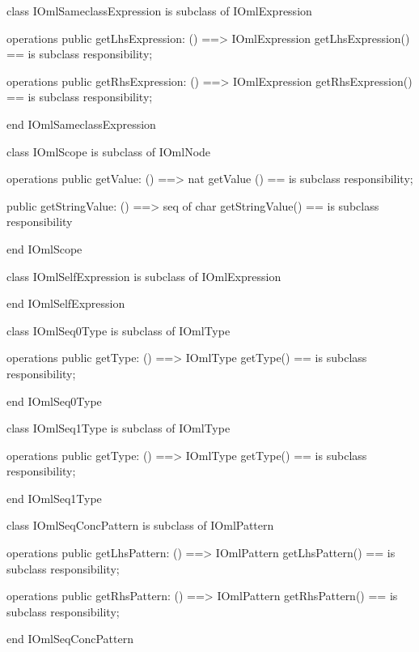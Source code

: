 \begin{vdm_al}
class IOmlSameclassExpression
 is subclass of IOmlExpression

operations
  public getLhsExpression: () ==> IOmlExpression
  getLhsExpression() == is subclass responsibility;

operations
  public getRhsExpression: () ==> IOmlExpression
  getRhsExpression() == is subclass responsibility;

end IOmlSameclassExpression
\end{vdm_al}

\begin{vdm_al}
class IOmlScope
 is subclass of IOmlNode

operations
  public getValue: () ==> nat
  getValue () == is subclass responsibility;

  public getStringValue: () ==> seq of char
  getStringValue() == is subclass responsibility

end IOmlScope
\end{vdm_al}

\begin{vdm_al}
class IOmlSelfExpression
 is subclass of IOmlExpression

end IOmlSelfExpression
\end{vdm_al}

\begin{vdm_al}
class IOmlSeq0Type
 is subclass of IOmlType

operations
  public getType: () ==> IOmlType
  getType() == is subclass responsibility;

end IOmlSeq0Type
\end{vdm_al}

\begin{vdm_al}
class IOmlSeq1Type
 is subclass of IOmlType

operations
  public getType: () ==> IOmlType
  getType() == is subclass responsibility;

end IOmlSeq1Type
\end{vdm_al}

\begin{vdm_al}
class IOmlSeqConcPattern
 is subclass of IOmlPattern

operations
  public getLhsPattern: () ==> IOmlPattern
  getLhsPattern() == is subclass responsibility;

operations
  public getRhsPattern: () ==> IOmlPattern
  getRhsPattern() == is subclass responsibility;

end IOmlSeqConcPattern
\end{vdm_al}


